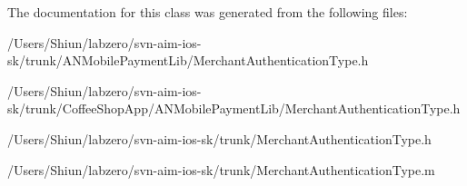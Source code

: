 The documentation for this class was generated from the following files:\begin{DoxyCompactItemize}
\item 
/Users/Shiun/labzero/svn-\/aim-\/ios-\/sk/trunk/ANMobilePaymentLib/MerchantAuthenticationType.h\item 
/Users/Shiun/labzero/svn-\/aim-\/ios-\/sk/trunk/CoffeeShopApp/ANMobilePaymentLib/MerchantAuthenticationType.h\item 
/Users/Shiun/labzero/svn-\/aim-\/ios-\/sk/trunk/MerchantAuthenticationType.h\item 
/Users/Shiun/labzero/svn-\/aim-\/ios-\/sk/trunk/MerchantAuthenticationType.m\end{DoxyCompactItemize}
